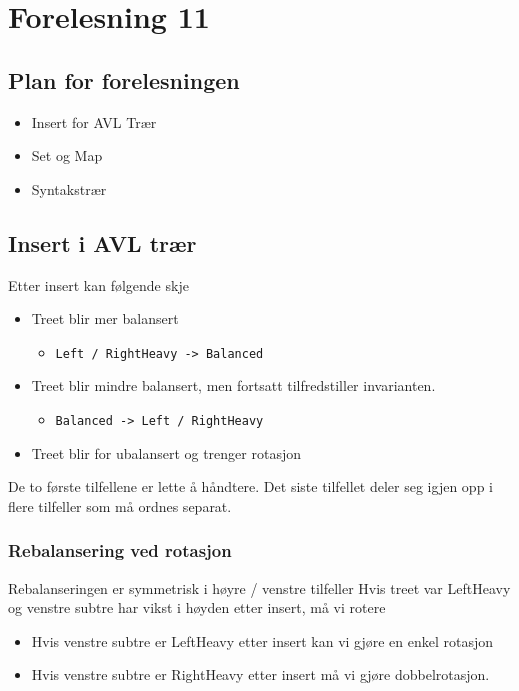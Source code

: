 \documentclass{article}
\begin{document}
    \section{Forelesning 11}

    \subsection{Plan for forelesningen}
    \begin{itemize}
        \item Insert for AVL Trær
        \item Set og Map
        \item Syntakstrær
    \end{itemize}

    \subsection{Insert i AVL trær}
    Etter insert kan følgende skje
    \begin{itemize}
        \item Treet blir mer balansert
            \begin{itemize}
            \item \texttt{Left / RightHeavy -> Balanced}
            \end{itemize}
        \item Treet blir mindre balansert, men fortsatt tilfredstiller invarianten.
            \begin{itemize}
                \item \texttt{Balanced -> Left / RightHeavy}
            \end{itemize}
        \item Treet blir for ubalansert og trenger rotasjon
    \end{itemize}
De to første tilfellene er lette å håndtere. Det siste tilfellet deler seg
igjen opp i flere tilfeller som må ordnes separat.

\subsubsection{Rebalansering ved rotasjon}
Rebalanseringen er symmetrisk i høyre / venstre tilfeller
Hvis treet var LeftHeavy og venstre subtre har vikst i høyden etter insert, må vi rotere
\begin{itemize}
    \item Hvis venstre subtre er LeftHeavy etter insert kan vi gjøre en enkel rotasjon
    \item Hvis venstre subtre er RightHeavy etter insert må vi gjøre dobbelrotasjon.
\end{itemize}
\end{document}
